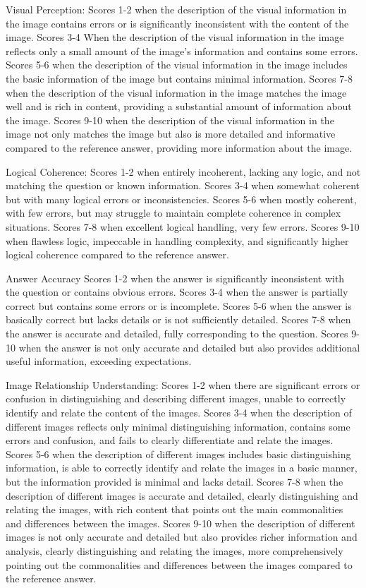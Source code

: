 Visual Perception:
Scores 1-2 when the description of the visual information in the image contains errors or is significantly inconsistent with the content of the image.
Scores 3-4 When the description of the visual information in the image reflects only a small amount of the image's information and contains some errors.
Scores 5-6 when the description of the visual information in the image includes the basic information of the image but contains minimal information.
Scores 7-8 when the description of the visual information in the image matches the image well and is rich in content, providing a substantial amount of information about the image.
Scores 9-10 when the description of the visual information in the image not only matches the image but also is more detailed and informative compared to the reference answer, providing more information about the image.

Logical Coherence:
Scores 1-2 when entirely incoherent, lacking any logic, and not matching the question or known information.
Scores 3-4 when somewhat coherent but with many logical errors or inconsistencies.
Scores 5-6 when mostly coherent, with few errors, but may struggle to maintain complete coherence in complex situations.
Scores 7-8 when excellent logical handling, very few errors.
Scores 9-10 when flawless logic, impeccable in handling complexity, and significantly higher logical coherence compared to the reference answer.

Answer Accuracy
Scores 1-2 when the answer is significantly inconsistent with the question or contains obvious errors.
Scores 3-4 when the answer is partially correct but contains some errors or is incomplete.
Scores 5-6 when the answer is basically correct but lacks details or is not sufficiently detailed.
Scores 7-8 when the answer is accurate and detailed, fully corresponding to the question.
Scores 9-10 when the answer is not only accurate and detailed but also provides additional useful information, exceeding expectations.

Image Relationship Understanding:
Scores 1-2 when there are significant errors or confusion in distinguishing and describing different images, unable to correctly identify and relate the content of the images.
Scores 3-4 when the description of different images reflects only minimal distinguishing information, contains some errors and confusion, and fails to clearly differentiate and relate the images.
Scores 5-6 when the description of different images includes basic distinguishing information, is able to correctly identify and relate the images in a basic manner, but the information provided is minimal and lacks detail.
Scores 7-8 when the description of different images is accurate and detailed, clearly distinguishing and relating the images, with rich content that points out the main commonalities and differences between the images.
Scores 9-10 when the description of different images is not only accurate and detailed but also provides richer information and analysis, clearly distinguishing and relating the images, more comprehensively pointing out the commonalities and differences between the images compared to the reference answer.


